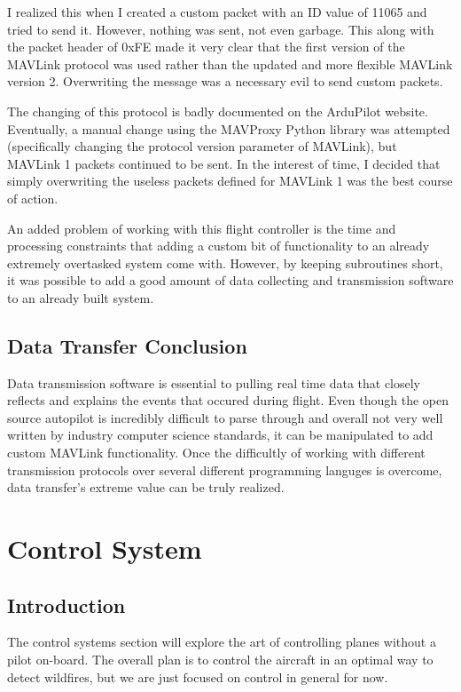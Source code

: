 \documentclass[12pt,journal,compsoc]{IEEEtran}
\begin{document}
I realized this when I created a custom packet with an ID value of 11065 and tried to send it. However, nothing was sent, not even garbage. This along with the packet header of 0xFE made it very clear that the first version of the MAVLink protocol was used rather than the updated and more flexible MAVLink version 2. Overwriting the message was a necessary evil to send custom packets. 

The changing of this protocol is badly documented on the ArduPilot website. Eventually, a manual change using the MAVProxy Python library was attempted (specifically changing the protocol version parameter of MAVLink), but MAVLink 1 packets continued to be sent. In the interest of time, I decided that simply overwriting the useless packets defined for MAVLink 1 was the best course of action.

An added problem of working with this flight controller is the time and processing constraints that adding a custom bit of functionality to an already extremely overtasked system come with. However, by keeping subroutines short, it was possible to add a good amount of data collecting and transmission software to an already built system.

\subsection{Data Transfer Conclusion}
Data transmission software is essential to pulling real time data that closely reflects and explains the events that occured during flight. Even though the open source autopilot is incredibly difficult to parse through and overall not very well written by industry computer science standards, it can be manipulated to add custom MAVLink functionality. Once the difficultly of working with different transmission protocols over several different programming languges is overcome, data transfer's extreme value can be truly realized. 

\section{Control System}
\subsection{Introduction}
The control systems section will explore the art of controlling planes without a pilot on-board. The overall plan is to control the aircraft in an optimal way to detect wildfires, but we are just focused on control in general for now.
\end{document}
